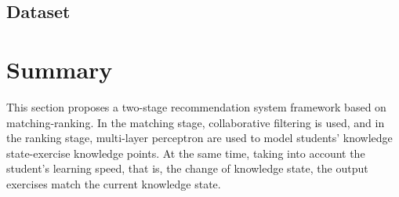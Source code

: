 \subsection{Dataset}

\section{Summary}
This section proposes a two-stage recommendation system framework based on matching-ranking. In the matching stage, collaborative filtering is used, and in the ranking stage, multi-layer perceptron are used to model students' knowledge state-exercise knowledge points. At the same time, taking into account the student's learning speed, that is, the change of knowledge state, the output exercises match the current knowledge state.
